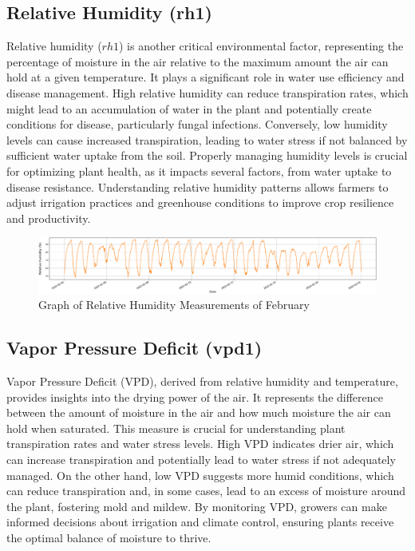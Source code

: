 \subsection{Relative Humidity (rh1)}

Relative humidity (\( rh1 \)) is another critical environmental factor, representing the percentage of moisture in the air relative to the maximum amount the air can hold at a given temperature. It plays a significant role in water use efficiency and disease management. High relative humidity can reduce transpiration rates, which might lead to an accumulation of water in the plant and potentially create conditions for disease, particularly fungal infections. Conversely, low humidity levels can cause increased transpiration, leading to water stress if not balanced by sufficient water uptake from the soil. Properly managing humidity levels is crucial for optimizing plant health, as it impacts several factors, from water uptake to disease resistance. Understanding relative humidity patterns allows farmers to adjust irrigation practices and greenhouse conditions to improve crop resilience and productivity.

\begin{figure}[htbp]
    \centering
    \includegraphics[width=15 cm]{4_ChapterMaterials/figuras/train_data_Relative_humidity.pdf}
    \caption{Graph of Relative Humidity Measurements of February}
    \end{figure}

\subsection{Vapor Pressure Deficit (vpd1)}

Vapor Pressure Deficit (VPD), derived from relative humidity and temperature, provides insights into the drying power of the air. It represents the difference between the amount of moisture in the air and how much moisture the air can hold when saturated. This measure is crucial for understanding plant transpiration rates and water stress levels. High VPD indicates drier air, which can increase transpiration and potentially lead to water stress if not adequately managed. On the other hand, low VPD suggests more humid conditions, which can reduce transpiration and, in some cases, lead to an excess of moisture around the plant, fostering mold and mildew. By monitoring VPD, growers can make informed decisions about irrigation and climate control, ensuring plants receive the optimal balance of moisture to thrive.


